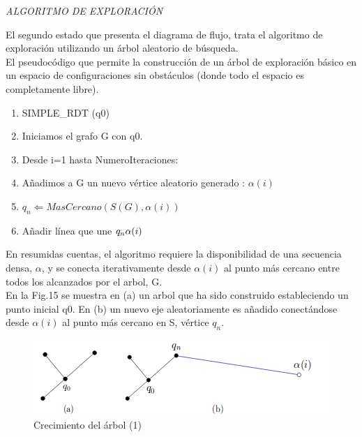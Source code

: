 \documentclass[conference]{IEEEtran}
\begin{document}
{\begin{center}
\textit{ALGORITMO DE EXPLORACIÓN}
\end{center}

El segundo estado que presenta el diagrama de flujo, trata el algoritmo de exploración utilizando un árbol aleatorio de búsqueda.\\

El pseudocódigo que permite la construcción de un árbol de exploración básico en un espacio de configuraciones sin obstáculos (donde todo el espacio es completamente libre).

\begin{enumerate}
\item SIMPLE\_RDT (q0)
\item \hspace{0.05cm} Iniciamos el grafo G con q0.
\item \hspace{0.05cm} Desde i=1 hasta NumeroIteraciones:
\item \hspace{0.1cm} Añadimos a G un nuevo vértice aleatorio generado : $\alpha (i)$
\item \hspace{0.1cm} $q_n \Leftarrow MasCercano(S(G),\alpha (i))$
\item \hspace{0.1cm} Añadir línea que une $q_n \- \alpha (i)$

\end{enumerate}

En resumidas cuentas, el algoritmo requiere la disponibilidad de una secuencia densa, $\alpha$, y se conecta iterativamente desde $\alpha (i)$ al punto más cercano entre todos los alcanzados por el arbol, G.\\

En la Fig.15 se muestra en (a) un arbol que ha sido construido estableciendo un punto inicial q0. En (b) un nuevo eje aleatoriamente es añadido conectándose desde $\alpha (i)$ al punto más cercano en S, vértice $q_n$.

\begin{figure}[H]
\centerline{\includegraphics[scale=0.6]{IMAGENES/RRT1.png}}
\caption{Crecimiento del árbol (1)}
\label{fig}
\end{figure}

}
\end{document}
